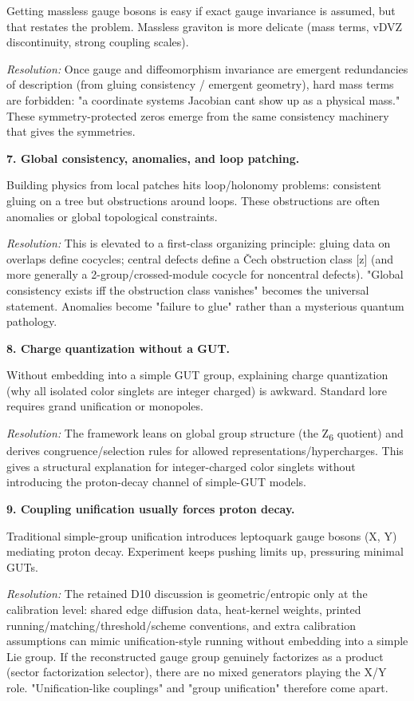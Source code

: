 Getting massless gauge bosons is easy if exact gauge invariance is assumed, but that restates the problem. Massless graviton is more delicate (mass terms, vDVZ discontinuity, strong coupling scales).

\emph{Resolution:} Once gauge and diffeomorphism invariance are emergent redundancies of description (from gluing consistency / emergent geometry), hard mass terms are forbidden: "a coordinate system\textquotesingle s Jacobian can\textquotesingle t show up as a physical mass." These symmetry-protected zeros emerge from the same consistency machinery that gives the symmetries.

\textbf{7. Global consistency, anomalies, and loop patching.}

Building physics from local patches hits loop/holonomy problems: consistent gluing on a tree but obstructions around loops. These obstructions are often anomalies or global topological constraints.

\emph{Resolution:} This is elevated to a first-class organizing principle: gluing data on overlaps define cocycles; central defects define a \v{C}ech obstruction class {[}z{]} (and more generally a 2-group/crossed-module cocycle for noncentral defects). "Global consistency exists iff the obstruction class vanishes" becomes the universal statement. Anomalies become "failure to glue" rather than a mysterious quantum pathology.

\textbf{8. Charge quantization without a GUT.}

Without embedding into a simple GUT group, explaining charge quantization (why all isolated color singlets are integer charged) is awkward. Standard lore requires grand unification or monopoles.

\emph{Resolution:} The framework leans on global group structure (the Z\textsubscript{6} quotient) and derives congruence/selection rules for allowed representations/hypercharges. This gives a structural explanation for integer-charged color singlets without introducing the proton-decay channel of simple-GUT models.

\textbf{9. Coupling unification usually forces proton decay.}

Traditional simple-group unification introduces leptoquark gauge bosons (X, Y) mediating proton decay. Experiment keeps pushing limits up, pressuring minimal GUTs.

\emph{Resolution:} The retained D10 discussion is geometric/entropic only at the calibration level: shared edge diffusion data, heat-kernel weights, printed running/matching/threshold/scheme conventions, and extra calibration assumptions can mimic unification-style running without embedding into a simple Lie group. If the reconstructed gauge group genuinely factorizes as a product (sector factorization selector), there are no mixed generators playing the X/Y role. "Unification-like couplings" and "group unification" therefore come apart.


